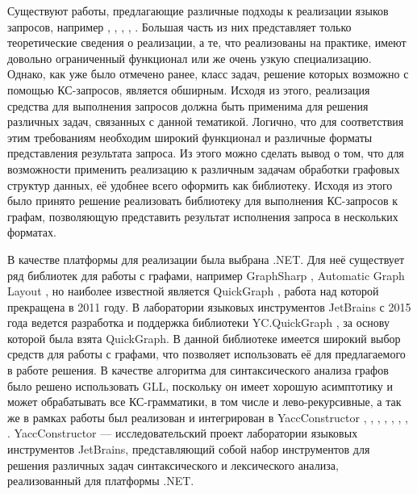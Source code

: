 \documentclass[14pt]{matmex-diploma-custom}
\begin{document}
	Существуют работы, предлагающие различные подходы к реализации языков запросов, например \cite{sevon2008subgraph}, \cite{hellings2014conjunctive}, \cite{zhang2016context}, \cite{abiteboul1997regular}, \cite{koschmieder2012regular}. Большая часть из них представляет только теоретические сведения о реализации, а те, что реализованы на практике, имеют довольно ограниченный функционал или же очень узкую специализацию. Однако, как уже было отмечено ранее, класс задач, решение которых возможно с помощью КС-запросов, является обширным. Исходя из этого, реализация средства для выполнения запросов должна быть применима для решения различных задач, связанных с данной тематикой. Логично, что для соответствия этим требованиям необходим широкий функционал и различные форматы представления результата запроса. Из этого можно сделать вывод о том, что для возможности применить реализацию к различным задачам обработки графовых структур данных, её удобнее всего оформить как библиотеку. Исходя из этого было принято решение реализовать библиотеку для выполнения КС-запросов к графам, позволяющую представить результат исполнения запроса в нескольких форматах.
	
	В качестве платформы для реализации была выбрана .NET. Для неё существует ряд библиотек для работы с графами, например GraphSharp \cite{graphsharp}, Automatic Graph Layout \cite{agl}, но наиболее известной является QuickGraph \cite{quickgraph}, работа над которой прекращена в 2011 году. В лаборатории языковых инструментов JetBrains с 2015 года ведется разработка и поддержка библиотеки YC.QuickGraph \cite{YC.QuickGraph}, за основу которой была взята QuickGraph. В данной библиотеке имеется широкий выбор средств для работы с графами, что позволяет использовать её для предлагаемого в работе решения. В качестве алгоритма для синтаксического анализа графов было решено использовать GLL\cite{gll}, поскольку он имеет хорошую асимптотику и может обрабатывать все КС-грамматики, в том числе и лево-рекурсивные, а так же в рамках работы \cite{ragRelaxedParsing} был реализован и интегрирован в YaccConstructor \cite{YaccConstructorPage}, \cite{авдюхин2012создание}, \cite{кириленко2013разработка}, \cite{gsv_phd}, \cite{кириленко2013разработка}, \cite{азимов2016syntax}, \cite{ковалев2016реализация}, \cite{полубелова2014генератор}. YaccConstructor --- исследовательский проект лаборатории языковых инструментов JetBrains, представляющий собой набор инструментов для решения различных задач синтаксического и лексического анализа, реализованный для платформы .NET.
	
\end{document}
